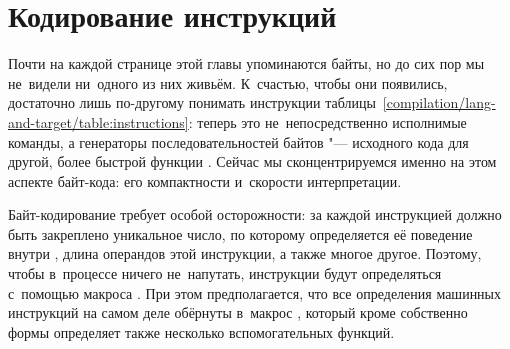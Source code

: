 \section{Кодирование инструкций}\label{compilation/sect:coding}

Почти на каждой странице этой главы упоминаются байты, но до сих пор мы
не~видели ни~одного из них живьём. К~счастью, чтобы они появились, достаточно
лишь по-другому понимать инструкции
таблицы~\ref{compilation/lang-and-target/table:instructions}: теперь это
не~непосредственно исполнимые команды, а генераторы последовательностей байтов
"--- исходного кода для другой, более быстрой функции . Сейчас мы
сконцентрируемся именно на этом аспекте байт-кода: его компактности и~скорости
интерпретации.

Байт-кодирование требует особой осторожности: за каждой инструкцией должно быть
закреплено уникальное число, по которому определяется её поведение внутри
, длина операндов этой инструкции, а также многое другое. Поэтому, чтобы
в~процессе ничего не~напутать, инструкции будут определяться с~помощью макроса
. При этом предполагается, что все определения машинных
инструкций на самом деле обёрнуты в~макрос , который
кроме собственно формы  определяет также несколько
вспомогательных функций.


